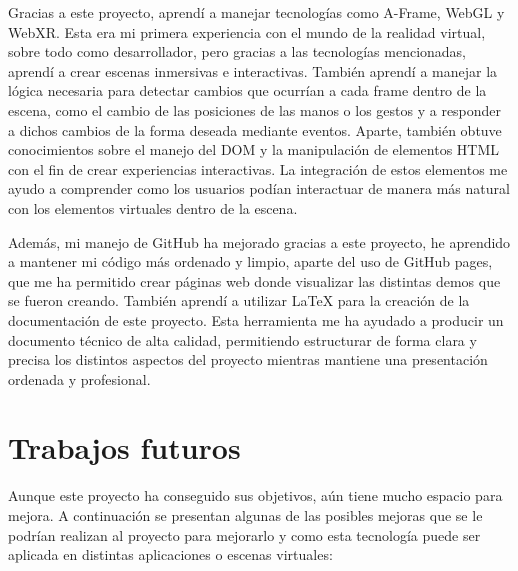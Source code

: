 \documentclass[a4paper, 12pt]{book}
\begin{document}
Gracias a este proyecto, aprendí a manejar tecnologías como A-Frame, WebGL y WebXR. Esta era mi primera experiencia con el mundo de la realidad virtual, sobre todo como desarrollador, pero gracias a las tecnologías mencionadas, aprendí a crear escenas inmersivas e interactivas. También aprendí a manejar la lógica necesaria para detectar cambios que ocurrían a cada frame dentro de la escena, como el cambio de las posiciones de las manos o los gestos y a responder a dichos cambios de la forma deseada mediante eventos. 
Aparte, también obtuve conocimientos sobre el manejo del DOM y la manipulación de elementos HTML con el fin de crear experiencias interactivas. La integración de estos elementos me ayudo a comprender como los usuarios podían interactuar de manera más natural con los elementos virtuales dentro de la escena.

Además, mi manejo de GitHub ha mejorado gracias a este proyecto, he aprendido a mantener mi código más ordenado y limpio, aparte del uso de GitHub pages, que me ha permitido crear páginas web donde visualizar las distintas demos que se fueron creando. También aprendí a utilizar LaTeX para la creación de la documentación de este proyecto. Esta herramienta me ha ayudado a producir un documento técnico de alta calidad, permitiendo estructurar de forma clara y precisa los distintos aspectos del proyecto mientras mantiene una presentación ordenada y profesional. 

\section{Trabajos futuros}
\label{sec:trabajos_futuros}
Aunque este proyecto ha conseguido sus objetivos, aún tiene mucho espacio para mejora. A continuación se presentan algunas de las posibles mejoras que se le podrían realizan al proyecto para mejorarlo y como esta tecnología puede ser aplicada en distintas aplicaciones o escenas virtuales:
\end{document}
